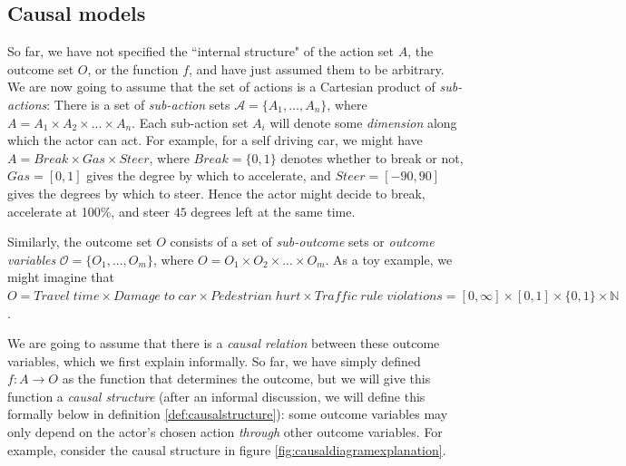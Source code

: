 \subsection{Causal models}\label{sec:causal:structuresandmodels}

So far, we have not specified the ``internal structure" of the action set $A$, the outcome set $O$, or the function $f$, and have just assumed them to be arbitrary. We are now going to assume that the set of actions is a Cartesian product of \textit{sub-actions}: There is a set of \textit{sub-action} sets $\mathcal A=\{A_1,...,A_n\}$, where $A = A_1\times A_2\times...\times A_n$. Each sub-action set $A_i$ will denote some \textit{dimension} along which the actor can act. For example, for a self driving car, we might have $A=Break\times Gas\times Steer$, where $Break=\{0,1\}$ denotes whether to break or not, $Gas=[0,1]$ gives the degree by which to accelerate, and $Steer=[-90,90]$ gives the degrees by which to steer. Hence the actor might decide to break, accelerate at 100\%, and steer $45$ degrees left at the same time. 

Similarly, the outcome set $O$ consists of a set of \textit{sub-outcome} sets or \textit{outcome variables} $\mathcal O=\{O_1,...,O_m\}$, where $O=O_1\times O_2\times ... \times O_m$. As a toy example, we might imagine that $O=Travel \; time \times  Damage\; to\; car \times Pedestrian\; hurt \times Traffic\; rule\; violations=[0,\infty]\times[0,1]\times\{0,1\}\times \mathbb N$.

We are going to assume that there is a \textit{causal relation} between these outcome variables, which we first explain informally. So far, we have simply defined $f\colon A\to O$ as the function that determines the outcome, but we will give this function a \textit{causal structure} (after an informal discussion, we will define this formally below in definition \ref{def:causalstructure}): some outcome variables may only depend on the actor's chosen action \textit{through} other outcome variables. For example, consider the causal structure in figure \ref{fig:causaldiagramexplanation}.

